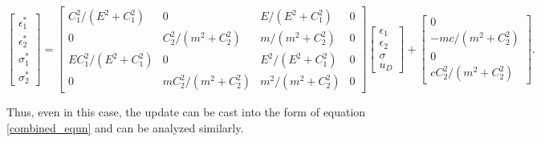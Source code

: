 \documentclass[10pt]{elsarticle}
\begin{document}
\begin{equation}
	\begin{bmatrix}
		\epsilon_1^* \\
		\epsilon_2^* \\
		\sigma_1^* \\
		\sigma_2^* 
	\end{bmatrix} 
	= 
	\begin{bmatrix}
		C_1^2/(E^2 + C_1^2) & 0 & E/(E^2 + C_1^2) & 0 \\
		0 & C_2^2/(m^2 + C_2^2)  & m/(m^2 + C_2^2) &0 \\
		E C_1^2/(E^2 + C_1^2) & 0 & E^2/(E^2 + C_1^2) &0\\
		0 & mC_2^2/(m^2 + C_2^2)  & m^2/(m^2 + C_2^2) &0
	\end{bmatrix} 
	\begin{bmatrix}
		\epsilon_1 \\
		\epsilon_2 \\
		\sigma \\
		u_D
	\end{bmatrix} + 
	\begin{bmatrix}
		0 \\
		-mc/(m^2+C_2^2) \\
		0 \\
		cC_2^2/(m^2+C_2^2)
	\end{bmatrix} .
\end{equation}

Thus, even in this case, the update can be cast into the form of equation \ref{combined_equn} and can be analyzed similarly.
\end{document}
